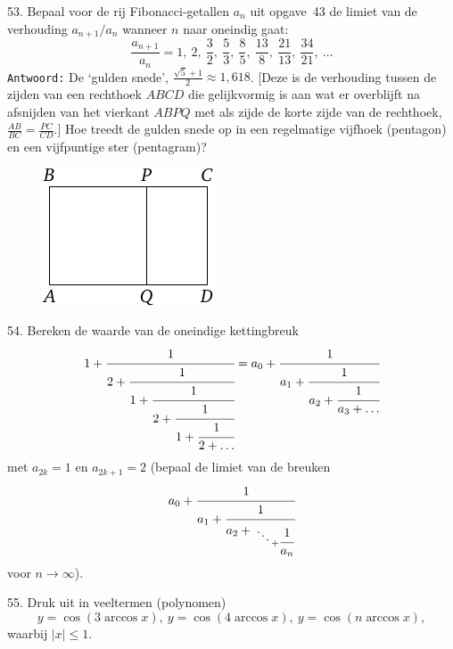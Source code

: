 \clearpage

\begin{problem}{53.}
	Bepaal voor de rij Fibonacci-getallen $a_n$ uit opgave~43 de limiet van de verhouding $a_{n+1}/a_n$ wanneer $n$ naar oneindig gaat:
	\begin{equation*}
		\frac{a_{n+1}}{a_n} = 1, \ 2, \ \frac{3}{2}, \ \frac{5}{3}, \ \frac{8}{5}, \ \frac{13}{8}, \ \frac{21}{13}, \ \frac{34}{21}, \ \dotsc
	\end{equation*}
\noindent \texttt{Antwoord:} De `gulden snede', $\frac{\sqrt{5} + 1}{2} \approx 1{,}618$. [Deze is de verhouding tussen de zijden van een rechthoek $ABCD$ die gelijkvormig is aan wat er overblijft na afsnijden van het vierkant $ABPQ$ met als zijde de korte zijde van de rechthoek, $\frac{AB}{BC} = \frac{PC}{CD}$.] Hoe treedt de gulden snede op in een regelmatige vijfhoek (pentagon) en een vijfpuntige ster (pentagram)?
	\begin{figure}
		\includegraphics{resources/taskbook-37}
	\end{figure}
\end{problem}

\begin{problem}{54.}
	Bereken de waarde van de oneindige kettingbreuk
	\begin{equation*}
		1 + \cfrac{1}{2 + \cfrac{1}{1 + \cfrac{1}{2 + \cfrac{1}{1 + \cfrac{1}{2 + \ldots}}}}} = a_0 + \cfrac{1}{a_1 + \cfrac{1}{a_2 + \cfrac{1}{a_3 + \ldots}}}
	\end{equation*}
	met $a_{2k} = 1$ en $a_{2k + 1} = 2$ (bepaal de limiet van de breuken
	\begin{equation*}
		a_0 + \cfrac{1}{a_1 + \cfrac{1}{a_2 + {\atop{\ddots\atop{}} + \cfrac{1}{a_n}}}}
	\end{equation*}
	voor $n \to \infty$).
\end{problem}

\clearpage

\begin{problem}{55.}
	Druk uit in veeltermen (polynomen)
	\begin{equation*}
		y = \cos (3 \arccos x),\ y = \cos (4 \arccos x),\ y = \cos (n \arccos x),
	\end{equation*}
	waarbij $|x| \leqslant 1$.
\end{problem}

